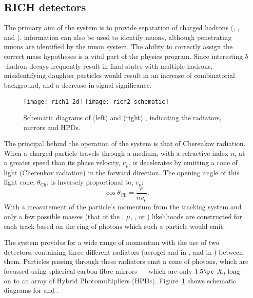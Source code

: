 \subsection{RICH detectors}

The primary aim of the \lhcb \rich system is to provide \pid separation of charged hadrons (\pion,
\kaon, and \proton).
\rich information can also be used to identify muons, although penetrating muons are identified by
the muon system.
The ability to correctly assign the correct mass hypotheses is a vital part of the \lhcb physics
program.
Since interesting $b$-hadron decays frequently result in final states with multiple hadrons,
misidentifying daughter particles would result in an increase of combinatorial background, and
a decrease in signal significance.

\begin{figure}
  \begin{center}
    \texttt{[image: rich1\_2d]}
    \texttt{[image: rich2\_schematic]}
    \caption[Diagmra of the LHCb RICH detectors]
    {\small
      Schematic diagrams of (left) \richone and (right) \richtwo, indicating the radiators,
      mirrors and HPDs.
    }
    \label{fig:lhcb:rich}
  \end{center}
\end{figure}

The principal behind the operation of the \rich system is that of Cherenkov radiation.
When a charged particle travels through a medium, with a refractive index $n$, at a greater speed
than its phase velocity, $v_p$, is decelerates by emitting a cone of light (Cherenkov radiation) in
the forward direction.
The opening angle of this light cone, $\theta_\mathrm{Ch}$, is inversely proportional to, $v_p$:
\begin{equation}
  \cos\theta_\mathrm{Ch}=\frac{c}{nv_p}.
\end{equation}
With a measurement of the particle's momentum from the tracking system and only a few possible
masses (that of the \electron, $\mu$, \pion, \kaon or \proton) likelihoods are constructed for each
track based on the ring of photons which such a particle would emit.

The \lhcb \rich system provides \pid for a wide range of momentum with the use of two \rich
detectors, containing three different radiators (aerogel and \cfourften in
\richone, and \cffour in \richtwo) between them.
Particles passing through these radiators emit a cone of photons, which are focussed using
spherical carbon fibre mirrors --- which are only $1.5\pc$ $X_0$ long --- on to an array of Hybrid
Photomultipliers (HPDs).
Figure~\ref{fig:lhcb:rich} shows schematic diagrams for \richone and \richtwo.

